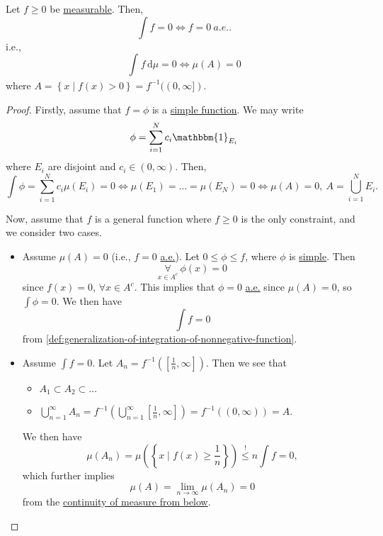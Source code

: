\begin{proposition}\label{prop:lec12-1}
	Let \(f\geq 0\) be \hyperref[def:measurable-function]{measurable}. Then,
	\[
		\int f = 0 \iff f = 0\ \hyperref[def:mu-almost-everywhere]{a.e.}.
	\]
	i.e.,
	\[
		\int_{}^{} f \,\mathrm{d}\mu = 0 \iff \mu (A) = 0
	\]
	where \(A = \left\{x \mid f(x)>0\right\} = f^{-1} ((0, \infty ])\).
\end{proposition}
\begin{proof}
	Firstly, assume that \(f = \phi \) is a \hyperref[def:simple-function]{simple function}. We may write
	\[
		\phi = \sum_{i=1}^{N} c_{i}\mathbbm{1}_{E_{i}}
	\]
	where \(E_{i}\) are disjoint and \(c_{i}\in(0, \infty )\). Then,
	\[
		\int \phi = \sum_{i=1}^{N} c_{i}\mu (E_{i}) = 0
		\iff \mu (E_1) = \dots = \mu (E_{N}) = 0
		\iff \mu (A) = 0,\ A = \bigcup_{i=1}^{N} E_{i}.
	\]

	Now, assume that \(f\) is a general function where \(f\geq 0\) is the only constraint, and we consider two cases.
	\begin{itemize}
		\item Assume \(\mu (A) = 0\) (i.e., \(f = 0\) \hyperref[def:mu-almost-everywhere]{a.e.}). Let \(0\leq \phi \leq f\), where \(\phi\) is \hyperref[def:simple-function]{simple}. Then
		      \[
			      \underset{x\in A^{c} }{\forall }\ \phi (x) = 0
		      \]
		      since \(f(x) = 0\), \(\forall x\in A^{c} \). This implies that \(\phi = 0\) \hyperref[def:mu-almost-everywhere]{a.e.} since \(\mu (A) = 0\), so \(\int \phi =0\). We then have
		      \[
			      \int f = 0
		      \]
		      from \autoref{def:generalization-of-integration-of-nonnegative-function}.
		\item Assume \(\int f = 0\). Let \(A_{n} = f^{-1} \left(\left[\frac{1}{n}, \infty \right]\right)\). Then we see that
		      \begin{itemize}
			      \item \(A_1\subset A_2\subset \dots  \)
			      \item \(\bigcup_{n=1}^{\infty} A_{n} = f^{-1} \left(\bigcup_{n=1}^{\infty} \left[\frac{1}{n}, \infty \right]\right) = f^{-1} ((0, \infty )) = A\).
		      \end{itemize}
		      We then have
		      \[
			      \mu (A_{n}) = \mu \left(\left\{x \mid f(x)\geq \frac{1}{n}\right\}\right) \overset{\hyperref[lma:Markov-inequality]{!}}{\leq }n \int f = 0,
		      \]
		      which further implies
		      \[
			      \mu (A) = \lim_{n \to \infty} \mu (A_{n}) = 0
		      \]
		      from the \hyperref[thm:measure-space-continuity-from-below]{continuity of measure from below}.
	\end{itemize}
\end{proof}

